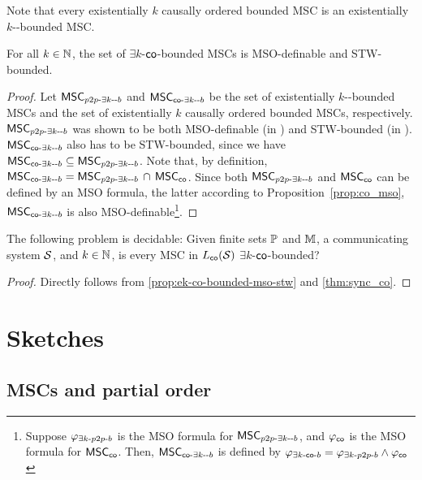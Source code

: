 \documentclass{article}
\begin{document}
Note that every existentially $k$ causally ordered bounded MSC is an existentially $k$-\pp-bounded MSC.

\begin{proposition}\label{prop:ek-co-bounded-mso-stw}
For all $k \in \mathbb{N}$, the set of $\exists k$-$\mathsf{co}$-bounded MSCs is MSO-definable and STW-bounded.
\end{proposition}
\begin{proof}
Let $\mathsf{MSC}_{p2p\text{-}\exists k\text{-}\text{-}b}$ and $\mathsf{MSC}_{\mathsf{co}\text{-}\exists k\text{-}\text{-}b}$ be the set of existentially $k$-\pp-bounded MSCs and the set of existentially $k$ causally ordered bounded MSCs, respectively. $\mathsf{MSC}_{p2p\text{-}\exists k\text{-}\text{-}b}$ was shown to be both MSO-definable (in \cite{DBLP:journals/iandc/LohreyM04}) and STW-bounded (in \cite[Proposition 5.4, page 163]{DBLP:journals/corr/abs-1904-06942}). $\mathsf{MSC}_{\mathsf{co}\text{-}\exists k\text{-}\text{-}b}$ also has to be STW-bounded, since we have $\mathsf{MSC}_{\mathsf{co}\text{-}\exists k\text{-}\text{-}b} \subseteq \mathsf{MSC}_{p2p\text{-}\exists k\text{-}\text{-}b}$. Note that, by definition, $\mathsf{MSC}_{\mathsf{co}\text{-}\exists k\text{-}\text{-}b} = \mathsf{MSC}_{p2p\text{-}\exists k\text{-}\text{-}b}\, \cap\, \mathsf{MSC}_{\mathsf{co}}$. Since both $\mathsf{MSC}_{p2p\text{-}\exists k\text{-}\text{-}b}$ and $\mathsf{MSC}_{\mathsf{co}}$ can be defined by an MSO formula, the latter according to Proposition~\ref{prop:co_mso}, $\mathsf{MSC}_{\mathsf{co}\text{-}\exists k\text{-}\text{-}b}$ is also MSO-definable\footnote{Suppose $\varphi_{\exists k\text{-}p2p\text{-}b}$ is the MSO formula for $\mathsf{MSC}_{p2p\text{-}\exists k\text{-}\text{-}b}$, and $\varphi_{\mathsf{co}}$ is the MSO formula for $\mathsf{MSC}_{\mathsf{co}}$. Then, $\mathsf{MSC}_{\mathsf{co}\text{-}\exists k\text{-}\text{-}b}$ is defined by $\varphi_{\exists k\text{-}\mathsf{co}\text{-}b} = \varphi_{\exists k\text{-}p2p\text{-}b} \wedge \varphi_{\mathsf{co}}$}.
\end{proof}

\begin{theorem}\label{thm:sync_ek_co_bounded}
	The following problem is decidable: Given finite sets $\mathbb{P}$ and $\mathbb{M}$, a communicating system $\mathcal{S}$, and $k \in \mathbb{N}$, is every MSC in $L_{\mathsf{co}}(\mathcal{S})$ $\exists k$-$\mathsf{co}$-bounded?
\end{theorem}
\begin{proof}
	Directly follows from \ref{prop:ek-co-bounded-mso-stw} and \ref{thm:sync_co}.
\end{proof}

\section{Sketches}

\subsection{MSCs and partial order}

\end{document}
